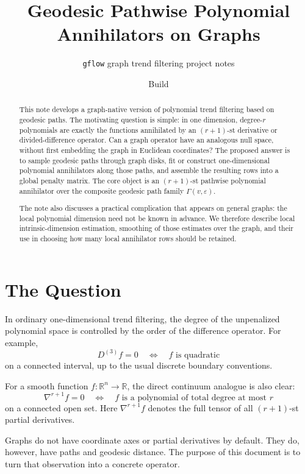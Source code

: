 \documentclass[11pt]{article}
\title{Geodesic Pathwise Polynomial Annihilators on Graphs}
\author{\texttt{gflow} graph trend filtering project notes}
\date{Build \reportbuilddatetime}
\newcommand{\R}{\mathbb R}
\newcommand{\Geo}{\Gamma}
\newcommand{\eps}{\varepsilon}
\begin{document}
\maketitle

\begin{abstract}
This note develops a graph-native version of polynomial trend filtering based
on geodesic paths.  The motivating question is simple: in one dimension,
degree-\(r\) polynomials are exactly the functions annihilated by an
\((r+1)\)-st derivative or divided-difference operator.  Can a graph operator
have an analogous null space, without first embedding the graph in Euclidean
coordinates?  The proposed answer is to sample geodesic paths through graph
disks, fit or construct one-dimensional polynomial annihilators along those
paths, and assemble the resulting rows into a global penalty matrix.  The core
object is an \((r+1)\)-st pathwise polynomial annihilator over the composite
geodesic path family \(\Geo(v,\eps)\).

The note also discusses a practical complication that appears on general
graphs: the local polynomial dimension need not be known in advance.  We
therefore describe local intrinsic-dimension estimation, smoothing of those
estimates over the graph, and their use in choosing how many local annihilator
rows should be retained.
\end{abstract}

\section{The Question}

In ordinary one-dimensional trend filtering, the degree of the unpenalized
polynomial space is controlled by the order of the difference operator.  For
example,
\[
  D^{(3)} f = 0
  \quad\Longleftrightarrow\quad
  f \text{ is quadratic}
\]
on a connected interval, up to the usual discrete boundary conventions.

For a smooth function \(f:\R^n\to\R\), the direct continuum analogue is also
clear:
\[
  \nabla^{r+1} f = 0
  \quad\Longleftrightarrow\quad
  f \text{ is a polynomial of total degree at most } r
\]
on a connected open set.  Here \(\nabla^{r+1}f\) denotes the full tensor of
all \((r+1)\)-st partial derivatives.

Graphs do not have coordinate axes or partial derivatives by default.  They do,
however, have paths and geodesic distance.  The purpose of this document is to
turn that observation into a concrete operator.
\end{document}
